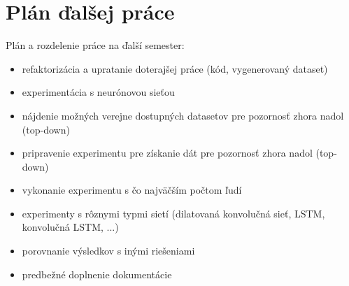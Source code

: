 \newpage
\pagestyle{plain}

\section{Plán ďalšej práce}

Plán a rozdelenie práce na ďalší semester:

\begin{itemize}
	\item refaktorizácia a upratanie doterajšej práce (kód, vygenerovaný dataset)
	\item experimentácia s neurónovou sieťou
	\item nájdenie možných verejne dostupných datasetov pre pozornosť zhora nadol (top-down)
	\item pripravenie experimentu pre získanie dát pre pozornosť zhora nadol (top-down)
	\item vykonanie experimentu s čo najväčším počtom ľudí
	\item experimenty s rôznymi typmi sietí (dilatovaná konvolučná sieť, LSTM, konvolučná LSTM, ...)
	\item porovnanie výsledkov s inými riešeniami
	\item predbežné doplnenie dokumentácie
\end{itemize}